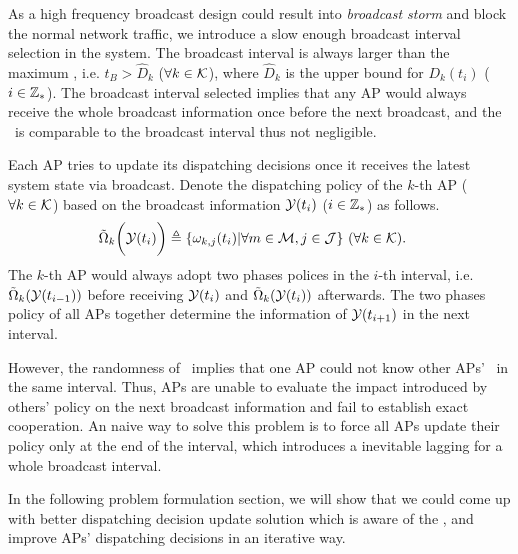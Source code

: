 As a high frequency broadcast design could result into \emph{broadcast storm} and block the normal network traffic, we introduce a slow enough broadcast interval selection in the system.
The broadcast interval is always larger than the maximum \brdelay, i.e. $t_B > \hat{D}_k$ ($\forall k\in\mathcal{K}$), where $\hat{D}_k$ is the upper bound for $D_{k}(t_{i})$ ($i\in\mathbb{Z}_{*}$).
The broadcast interval selected implies that any AP would always receive the whole broadcast information once before the next broadcast, and the \brdelay~is comparable to the broadcast interval thus not negligible.

Each AP tries to update its dispatching decisions once it receives the latest system state via broadcast.
Denote the dispatching policy of the $k$-th AP ($\forall k\in\mathcal{K}$) based on the broadcast information $\mathcal{Y}(t_{i})$ ($i \in\mathbb{Z}_{*}$) as follows.
\begin{align}
    &\tilde{\Omega}_{k}\bigg(\mathcal{Y}(t_{i})\bigg) \triangleq \{\omega_{k,j}(t_{i})|\forall m\in\mathcal{M}, j\in\mathcal{J}\}
    ~(\forall k\in\mathcal{K}).
    \label{def_action}
\end{align}
The $k$-th AP would always adopt two phases polices in the $i$-th interval, i.e. $\tilde{\Omega}_{k}(\mathcal{Y}(t_{i-1}))$ before receiving $\mathcal{Y}(t_{i})$ and $\tilde{\Omega}_{k}(\mathcal{Y}(t_{i}))$ afterwards.
The two phases policy of all APs together determine the information of $\mathcal{Y}(t_{i+1})$ in the next interval.

However, the randomness of \brdelay~implies that one AP could not know other APs' \brdelay~in the same interval.
Thus, APs are unable to evaluate the impact introduced by others' policy on the next broadcast information and fail to establish exact cooperation.
An naive way to solve this problem is to force all APs update their policy only at the end of the interval, which introduces a inevitable lagging for a whole broadcast interval.

In the following problem formulation section, we will show that we could come up with better dispatching decision update solution which is aware of the \brdelay, and improve APs' dispatching decisions in an iterative way.
